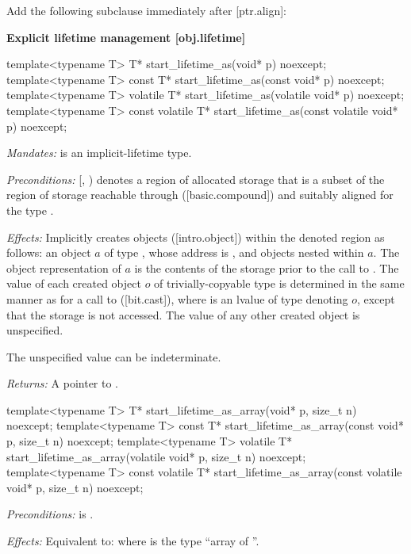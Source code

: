 Add the following subclause immediately after [ptr.align]:

\begin{addedblock}
\textbf{Explicit lifetime management \hspace{83mm}[obj.lifetime]}

\begin{codeblock}
template<typename T>
  T* start_lifetime_as(void* p) noexcept;
template<typename T>
  const T* start_lifetime_as(const void* p) noexcept;
template<typename T>
  volatile T* start_lifetime_as(volatile void* p) noexcept;
template<typename T>
  const volatile T* start_lifetime_as(const volatile void* p) noexcept;
\end{codeblock}

\begin{adjustwidth}{0.5cm}{0.5cm}
\emph{Mandates:}  is an implicit-lifetime type.

\emph{Preconditions:} [, ) denotes a region of allocated storage that is a subset of the region of storage reachable through ([basic.compound])  and suitably aligned for the type .

\emph{Effects:} Implicitly creates objects ([intro.object]) within the denoted region as follows: an object $a$ of type , whose address is , and objects nested within $a$. The object representation of $a$ is the contents of the storage prior to the call to . The value of each created object $o$ of trivially-copyable type  is determined in the same manner as for a call to  ([bit.cast]), where  is an lvalue of type  denoting $o$, except that the storage is not accessed. The value of any other created object is unspecified. \begin{note}The unspecified value can be indeterminate.\end{note}

\emph{Returns:} A pointer to .
\end{adjustwidth}

\begin{codeblock}
template<typename T>
  T* start_lifetime_as_array(void* p, size_t n) noexcept;
template<typename T>
  const T* start_lifetime_as_array(const void* p, size_t n) noexcept;
template<typename T>
  volatile T* start_lifetime_as_array(volatile void* p, size_t n) noexcept;
template<typename T>
  const volatile T* start_lifetime_as_array(const volatile void* p, size_t n) noexcept;
\end{codeblock}

\begin{adjustwidth}{0.5cm}{0.5cm}
\emph{Preconditions:}  is .

\emph{Effects:} Equivalent to:  where  is the type ``array of  ''.
\end{adjustwidth}

\end{addedblock}

